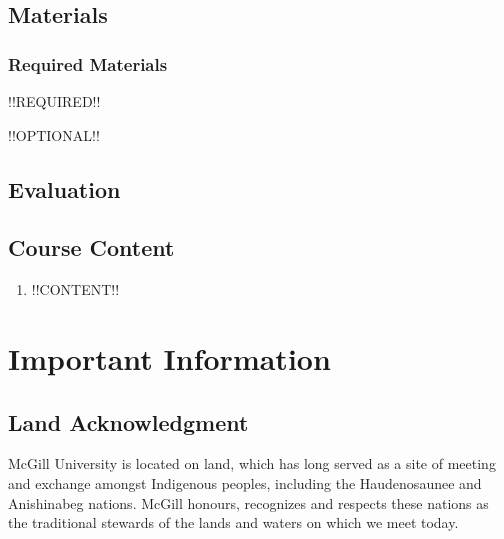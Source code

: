 \documentclass{article}
\begin{document}
\newpage

\subsection{Materials}

\subsubsection{Required Materials}

!!REQUIRED!!

!!OPTIONAL!!

\newpage

\subsection{Evaluation}
\label{eval}

\begin{center}
\end{center}

\newpage

\subsection{Course Content}

\begin{enumerate}
\item{!!CONTENT!!}
\end{enumerate}

\newpage

\section{Important Information}

\subsection{Land Acknowledgment}

McGill University is located on land, which has long served as a site
of meeting and exchange amongst Indigenous peoples, including the
Haudenosaunee and Anishinabeg nations. McGill honours, recognizes and
respects these nations as the traditional stewards of the lands and
waters on which we meet today.
\end{document}
